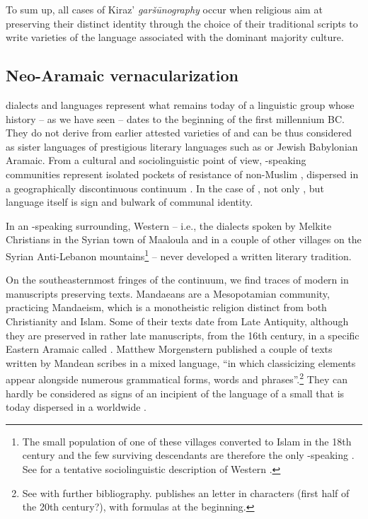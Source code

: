 \documentclass[output=paper,colorlinks,citecolor=brown,arabfont,syriacfont]{langscibook}
\begin{document}
To sum up, all cases of Kiraz' \textit{garšūnography} occur when religious  aim at preserving their distinct identity through the choice of their traditional scripts to write varieties of the language associated with the dominant majority culture.

    \subsection{Neo-Aramaic vernacularization}\label{ch.3.6.ss.3.2}

 dialects and languages represent what remains today of a linguistic group whose history -- as we have seen -- dates to the beginning of the first millennium BC. They do not derive from earlier attested varieties of  and can be thus considered as sister languages of prestigious literary languages such as  or Jewish Babylonian Aramaic. From a cultural and sociolinguistic point of view, -speaking communities represent isolated pockets of resistance of non-Muslim , dispersed in a geographically discontinuous  continuum \citep{kim2008,khan2020}. In the case of , not only , but language itself is sign and bulwark of communal identity.

In an -speaking surrounding, Western  -- i.e., the dialects spoken by Melkite Christians in the Syrian town of Maaloula and in a couple of other villages on the Syrian Anti-Lebanon mountains\footnote{%
The small population of one of these villages converted to Islam in the 18th century and the few surviving descendants are therefore the only -speaking . See \citet{contini_nicosia2020} for a tentative sociolinguistic description of Western .} -- never developed a written literary tradition. 


On the southeasternmost fringes of the  continuum, we find traces of modern  in manuscripts preserving  texts. Mandaeans are a Mesopotamian community, practicing Mandaeism, which is a monotheistic religion distinct from both Christianity and Islam. Some of their texts date from Late Antiquity, although they are preserved in rather late manuscripts, from the 16th century, in a specific Eastern Aramaic  called . Matthew Morgenstern published a couple of texts written by Mandean scribes in a mixed language, ``in which classicizing elements appear alongside numerous  grammatical forms, words and phrases''.\footnote{%
See \citet[120]{morgenstern2023} with further bibliography. \citet{haberl2021} publishes an  letter in  characters (first half of the 20th century?), with  formulas at the beginning.} They can hardly be considered as signs of an incipient  of the language of a small  that is today dispersed in a worldwide .
\end{document}
